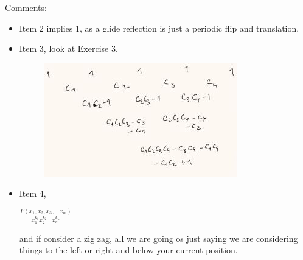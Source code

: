 \documentclass{article}
\begin{document}
Comments:
\begin{itemize}
  \item Item 2 implies 1, as a glide reflection is just a periodic flip and translation.
  \item Item 3, look at Exercise 3.
  \begin{figure}[!ht]
    \centering
    \includegraphics{./figures/L2.4}
  \end{figure}
  \item Item 4,
  \begin{ndefi}
    $\frac{P(x_1, x_2, x_3, \dots x_w)}{x_1^{k_1}x_2^{k_2}\dots x_w^{k_w}}$
  \end{ndefi}
  and if consider a zig zag, all we are going os just saying we are considering things to the left or right and below your current position.
\end{itemize}
\end{document}
